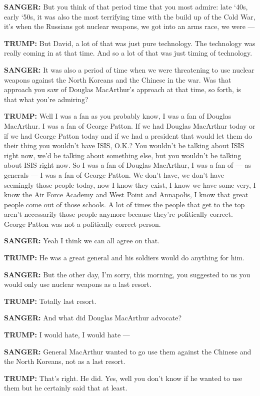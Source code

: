 \textbf{SANGER:} But you think of that period time that you most admire:
late `40s, early `50s, it was also the most terrifying time with the
build up of the Cold War, it's when the Russians got nuclear weapons, we
got into an arms race, we were ---

\textbf{TRUMP:} But David, a lot of that was just pure technology. The
technology was really coming in at that time. And so a lot of that was
just timing of technology.

\textbf{SANGER:} It was also a period of time when we were threatening
to use nuclear weapons against the North Koreans and the Chinese in the
war. Was that approach you saw of Douglas MacArthur's approach at that
time, so forth, is that what you're admiring?

\textbf{TRUMP:} Well I was a fan as you probably know, I was a fan of
Douglas MacArthur. I was a fan of George Patton. If we had Douglas
MacArthur today or if we had George Patton today and if we had a
president that would let them do their thing you wouldn't have ISIS,
O.K.? You wouldn't be talking about ISIS right now, we'd be talking
about something else, but you wouldn't be talking about ISIS right now.
So I was a fan of Douglas MacArthur, I was a fan of --- as generals ---
I was a fan of George Patton. We don't have, we don't have seemingly
those people today, now I know they exist, I know we have some very, I
know the Air Force Academy and West Point and Annapolis, I know that
great people come out of those schools. A lot of times the people that
get to the top aren't necessarily those people anymore because they're
politically correct. George Patton was not a politically correct person.

\textbf{SANGER:} Yeah I think we can all agree on that.

\textbf{TRUMP:} He was a great general and his soldiers would do
anything for him.

\textbf{SANGER:} But the other day, I'm sorry, this morning, you
suggested to us you would only use nuclear weapons as a last resort.

\textbf{TRUMP:} Totally last resort.

\textbf{SANGER:} And what did Douglas MacArthur advocate?

\textbf{TRUMP:} I would hate, I would hate ---

\textbf{SANGER:} General MacArthur wanted to go use them against the
Chinese and the North Koreans, not as a last resort.

\textbf{TRUMP:} That's right. He did. Yes, well you don't know if he
wanted to use them but he certainly said that at least.

